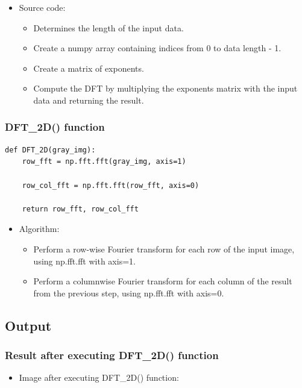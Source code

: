 \documentclass{article}
\begin{document}
\begin{itemize}
    \item Source code:
    \begin{itemize}
        \item Determines the length of the input data.
        \item Create a numpy array containing indices from 0 to data length - 1.
        \item Create a matrix of exponents.
        \item Compute the DFT by multiplying the exponents matrix with the input data and returning the result.
        
    \end{itemize}
\end{itemize}


\subsubsection{DFT\_2D() function}
\begin{lstlisting}[caption={Code of DFT\_2D() function}, label={DFT\_2D()}]
def DFT_2D(gray_img):
    row_fft = np.fft.fft(gray_img, axis=1)

    row_col_fft = np.fft.fft(row_fft, axis=0)

    return row_fft, row_col_fft
\end{lstlisting}

\begin{itemize}
    
    \item Algorithm:
    \begin{itemize}
        \item Perform a row-wise Fourier transform for each row of the input image, using np.fft.fft with axis=1.
        \item Perform a columnwise Fourier transform for each column of the result from the previous step, using np.fft.fft with axis=0.
    \end{itemize}
\end{itemize}



\subsection{Output}
\subsubsection{Result after executing DFT\_2D() function}
\begin{itemize}
    \item Image after executing DFT\_2D() function:
\end{itemize}
\end{document}
